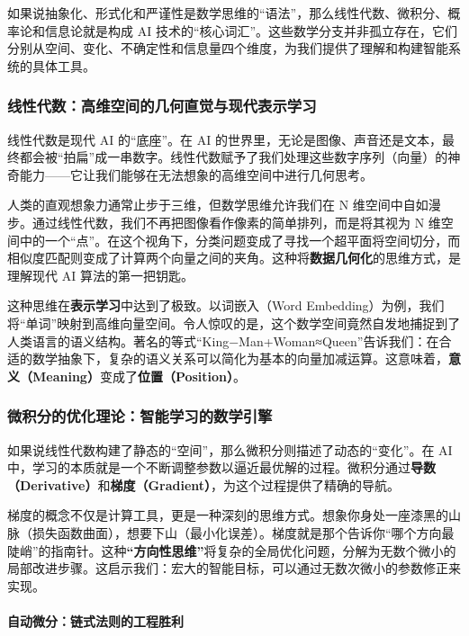 如果说抽象化、形式化和严谨性是数学思维的“语法”，那么线性代数、微积分、概率论和信息论就是构成 AI 技术的“核心词汇”。这些数学分支并非孤立存在，它们分别从空间、变化、不确定性和信息量四个维度，为我们提供了理解和构建智能系统的具体工具。

\subsubsection{线性代数：高维空间的几何直觉与现代表示学习}

线性代数是现代 AI 的“底座”。在 AI 的世界里，无论是图像、声音还是文本，最终都会被“拍扁”成一串数字。线性代数赋予了我们处理这些数字序列（向量）的神奇能力——它让我们能够在无法想象的高维空间中进行几何思考。

人类的直观想象力通常止步于三维，但数学思维允许我们在 N 维空间中自如漫步。通过线性代数，我们不再把图像看作像素的简单排列，而是将其视为 N 维空间中的一个“点”。在这个视角下，分类问题变成了寻找一个超平面将空间切分，而相似度匹配则变成了计算两个向量之间的夹角。这种将\textbf{数据几何化}的思维方式，是理解现代 AI 算法的第一把钥匙。

这种思维在\textbf{表示学习}中达到了极致。以词嵌入（Word Embedding）为例，我们将“单词”映射到高维向量空间。令人惊叹的是，这个数学空间竟然自发地捕捉到了人类语言的语义结构。著名的等式“King−Man+Woman≈Queen”告诉我们：在合适的数学抽象下，复杂的语义关系可以简化为基本的向量加减运算。这意味着，\textbf{意义（Meaning）}变成了\textbf{位置（Position）}。

\subsubsection{微积分的优化理论：智能学习的数学引擎}

如果说线性代数构建了静态的“空间”，那么微积分则描述了动态的“变化”。在 AI 中，学习的本质就是一个不断调整参数以逼近最优解的过程。微积分通过\textbf{导数（Derivative）}和\textbf{梯度（Gradient）}，为这个过程提供了精确的导航。

梯度的概念不仅是计算工具，更是一种深刻的思维方式。想象你身处一座漆黑的山脉（损失函数曲面），想要下山（最小化误差）。梯度就是那个告诉你“哪个方向最陡峭”的指南针。这种\textbf{“方向性思维”}将复杂的全局优化问题，分解为无数个微小的局部改进步骤。这启示我们：宏大的智能目标，可以通过无数次微小的参数修正来实现。

\paragraph{自动微分：链式法则的工程胜利}


